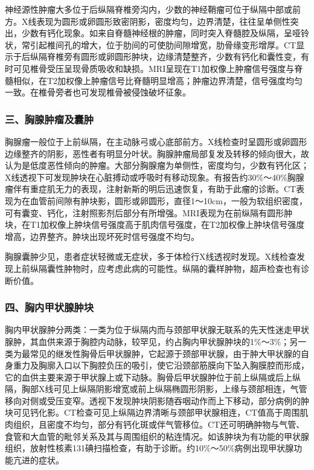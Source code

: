 神经源性肿瘤大多位于后纵隔脊椎旁沟内，少数的神经鞘瘤可位于纵隔中部或前方。X线表现为圆形或卵圆形致密阴影，密度均匀，边界清楚，往往呈单侧性突出，少数有钙化现象。如来自脊髓神经根的肿瘤，同时突入脊髓腔及纵隔，呈哑铃状，常引起椎间孔的增大，位于肋间的可使肋间隙增宽，肋骨缘变形增厚。CT显示于后纵隔脊椎旁有圆形或卵圆形肿块，边缘清楚整齐，少数有钙化和囊性变，有时可见椎骨受压呈现骨质吸收和缺损。MRI呈现在T1加权像上肿瘤信号强度与脊髓相似，在T2加权像上肿瘤信号比脊髓明显增高；肿瘤边界清楚，信号强度均匀一致。在椎骨旁者也可发现椎骨被侵蚀破坏征象。

\subsubsection{三、胸腺肿瘤及囊肿}

胸腺瘤一般位于上前纵隔，在主动脉弓或心底部前方。X线检查时呈圆形或卵圆形边缘整齐的阴影，恶性者有明显分叶状。胸腺肿瘤局部复发及转移的倾向很大，故认为是低度恶性倾向的肿瘤。大部分胸腺瘤为单侧性，密度均匀，少数有钙化区；X线透视下可发现肿块在心脏搏动或呼吸时有移动现象。有报告约30\%～40\%胸腺瘤伴有重症肌无力的表现，注射新斯的明后迅速恢复，有助于此瘤的诊断。CT表现为在血管前间隙有肿块影，圆形或卵圆形，直径1～10cm，一般为软组织密度，可有囊变、钙化，注射照影剂后部分有所增强。MRI表现为在前纵隔有圆形肿块，在T1加权像上肿块信号强度高于肌肉信号强度，在T2加权像上肿块信号强度增高，边界整齐。肿块出现坏死时信号强度不均匀。

胸腺囊肿少见，患者症状轻微或无症状，多于体检行X线透视时发现。X线检查发现上前纵隔囊性肿物时，应考虑此病的可能性。纵隔的囊样肿物，超声检查也有诊断价值。

\subsubsection{四、胸内甲状腺肿块}

胸内甲状腺肿分两类：一类为位于纵隔内而与颈部甲状腺无联系的先天性迷走甲状腺肿，其血供来源于胸腔内动脉，较罕见，约占胸内甲状腺肿块的1\%～3\%；另一类为最常见的继发性胸骨后甲状腺肿，它起源于颈部甲状腺，由于肿大甲状腺的自身重力及胸廓入口以下胸腔负压的吸引，使它沿颈部筋膜向下坠入胸膜腔而形成，它的血供主要来源于甲状腺上或下动脉。胸骨后甲状腺肿位于前上纵隔或后上纵隔，胸部X线可见上纵隔阴影增宽或前上纵隔椭圆形阴影，上缘与颈部相连，气管移向对侧或受压变窄。透视下发现肿块阴影随吞咽动作而上下移动，部分病例的肿块可见钙化影。CT检查可见上纵隔边界清晰与颈部甲状腺相连，CT值高于周围肌肉组织，且密度不均匀，部分有钙化斑或伴气管移位。CT还可明确肿物与气管、食管和大血管的毗邻关系及其与周围组织的粘连情况。如该肿块为有功能的甲状腺组织，放射性核素131碘扫描检查，有助于诊断。约10\%～50\%病例出现甲状腺功能亢进的症状。

